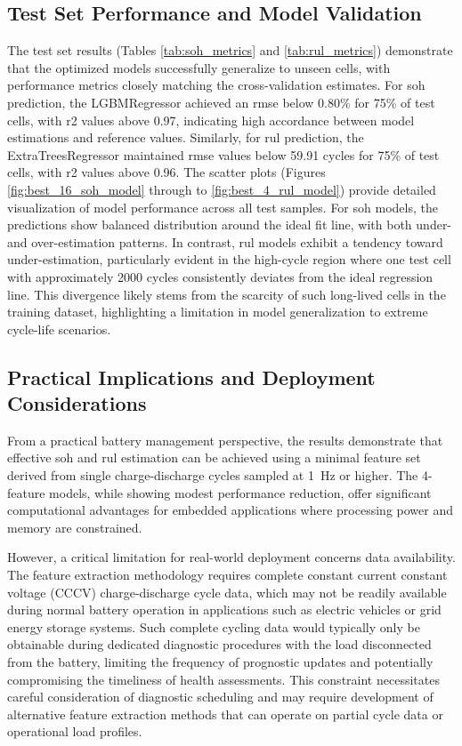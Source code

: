 \subsection{Test Set Performance and Model Validation}

The test set results (Tables \ref{tab:soh_metrics} and \ref{tab:rul_metrics}) demonstrate that the optimized models successfully generalize to unseen cells, with performance metrics closely matching the cross-validation estimates. For \ac{soh} prediction, the LGBMRegressor achieved an \ac{rmse} below 0.80\% for 75\% of test cells, with \acf{r2} values above 0.97, indicating high accordance between model estimations and reference values. Similarly, for \ac{rul} prediction, the ExtraTreesRegressor maintained \ac{rmse} values below 59.91 cycles for 75\% of test cells, with \ac{r2} values above 0.96.
The scatter plots (Figures \ref{fig:best_16_soh_model} through to \ref{fig:best_4_rul_model}) provide detailed visualization of model performance across all test samples. For \ac{soh} models, the predictions show balanced distribution around the ideal fit line, with both under- and over-estimation patterns. In contrast, \ac{rul} models exhibit a tendency toward under-estimation, particularly evident in the high-cycle region where one test cell with approximately 2000 cycles consistently deviates from the ideal regression line. This divergence likely stems from the scarcity of such long-lived cells in the training dataset, highlighting a limitation in model generalization to extreme cycle-life scenarios.

\subsection{Practical Implications and Deployment Considerations}

From a practical battery management perspective, the results demonstrate that effective \ac{soh} and \ac{rul} estimation can be achieved using a minimal feature set derived from single charge-discharge cycles sampled at 1~Hz or higher. The 4-feature models, while showing modest performance reduction, offer significant computational advantages for embedded applications where processing power and memory are constrained.

However, a critical limitation for real-world deployment concerns data availability. The feature extraction methodology requires complete constant current constant voltage (CCCV) charge-discharge cycle data, which may not be readily available during normal battery operation in applications such as electric vehicles or grid energy storage systems. Such complete cycling data would typically only be obtainable during dedicated diagnostic procedures with the load disconnected from the battery, limiting the frequency of prognostic updates and potentially compromising the timeliness of health assessments. This constraint necessitates careful consideration of diagnostic scheduling and may require development of alternative feature extraction methods that can operate on partial cycle data or operational load profiles.

